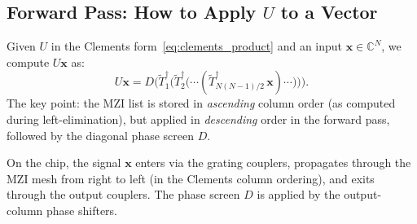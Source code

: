 \documentclass[12pt, a4paper]{article}
\newcommand{\CC}{\mathbb{C}}
\begin{document}
\subsection{Forward Pass: How to Apply $U$ to a Vector}

Given $U$ in the Clements form~\eqref{eq:clements_product} and an input
$\mathbf{x}\in\CC^N$, we compute $U\mathbf{x}$ as:
\begin{equation}
  U\mathbf{x} = D\bigl(\widetilde{T}_1^\dagger\bigl(
    \widetilde{T}_2^\dagger\bigl(\cdots
    (\widetilde{T}_{N(N-1)/2}^\dagger\,\mathbf{x})\cdots\bigr)\bigr)\bigr).
  \label{eq:forward_pass}
\end{equation}
The key point: the MZI list is stored in \emph{ascending} column order (as
computed during left-elimination), but applied in \emph{descending} order in
the forward pass, followed by the diagonal phase screen $D$.

On the chip, the signal $\mathbf{x}$ enters via the grating couplers,
propagates through the MZI mesh from right to left (in the Clements column
ordering), and exits through the output couplers.
The phase screen $D$ is applied by the output-column phase shifters.
\end{document}
